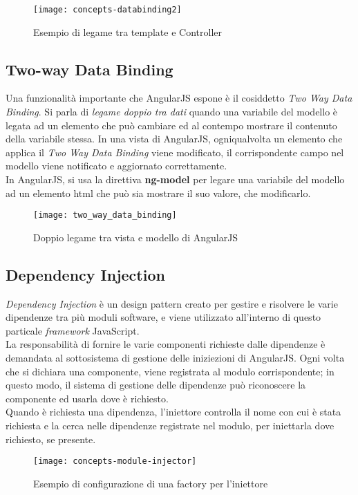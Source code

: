 \begin{figure}[!h] 
    \centering 
    \texttt{[image: concepts-databinding2]} 
    \caption{Esempio di legame tra template e Controller}
\end{figure}

\subsection{Two-way Data Binding}
Una funzionalità importante che AngularJS espone è il cosiddetto \emph{Two Way Data Binding}. Si parla di \emph{legame doppio tra dati} quando una variabile del modello è legata ad un elemento che può cambiare ed al contempo mostrare il contenuto della variabile stessa. In una vista di AngularJS, ogniqualvolta un elemento che applica il \emph{Two Way Data Binding} viene modificato, il corrispondente campo nel modello viene notificato e aggiornato correttamente.\\
In AngularJS, si usa la direttiva \textbf{ng-model} per legare una variabile del modello ad un elemento \gls{html} che può sia mostrare il suo valore, che modificarlo.

\begin{figure}[H] 
    \centering 
    \texttt{[image: two\_way\_data\_binding]} 
    \caption{Doppio legame tra vista e modello di AngularJS}
\end{figure}

\subsection{Dependency Injection}
\emph{Dependency Injection} è un design pattern creato per gestire e risolvere le varie dipendenze tra più moduli software, e viene utilizzato all'interno di questo particale \emph{framework} JavaScript.\\
La responsabilità di fornire le varie componenti richieste dalle dipendenze è demandata al sottosistema di gestione delle iniziezioni di AngularJS. Ogni volta che si dichiara una componente, viene registrata al modulo corrispondente; in questo modo, il sistema di gestione delle dipendenze può riconoscere la componente ed usarla dove è richiesto.\\
Quando è richiesta una dipendenza, l'iniettore controlla il nome con cui è stata richiesta e la cerca nelle dipendenze registrate nel modulo, per iniettarla dove richiesto, se presente.

\begin{figure}[!h] 
    \centering 
    \texttt{[image: concepts-module-injector]} 
    \caption{Esempio di configurazione di una factory per l'iniettore}
\end{figure}

